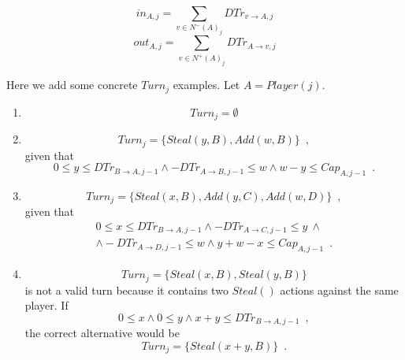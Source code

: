 \documentclass[11pt]{llncs}
\theoremstyle{definition}
\begin{document}
     \begin{definition}
     \label{inouttrust}
        \begin{equation}
           in_{A, j} = \sum\limits_{v \in N^{-}\left(A\right)_j}DTr_{v \rightarrow A, j}
        \end{equation}
        \begin{equation}
           out_{A, j} = \sum\limits_{v \in N^{+}\left(A\right)_j}DTr_{A \rightarrow v, j}
        \end{equation}
     \end{definition}
     \newpage 
     Here we add some concrete $Turn_j$ examples. Let $A = Player(j)$.
     \begin{enumerate}
        \item \begin{equation*}
           Turn_j = \emptyset
        \end{equation*}
        \item \begin{equation*}
           Turn_j = \{Steal\left(y, B\right), Add\left(w, B\right)\} \enspace,
        \end{equation*}
        given that
        \begin{equation*}
           0 \leq y \leq DTr_{B \rightarrow A, j-1} \wedge -DTr_{A \rightarrow B, j-1} \leq w \wedge w - y \leq
           Cap_{A, j-1} \enspace.
        \end{equation*}
        \item \begin{equation*}
           Turn_j = \{Steal\left(x, B\right), Add\left(y, C\right), Add\left(w, D\right)\} \enspace,
        \end{equation*}
        given that
        \begin{equation*}
        \begin{gathered}
           0 \leq x \leq DTr_{B \rightarrow A, j-1} \wedge -DTr_{A \rightarrow C, j-1} \leq y \: \wedge \\
           \wedge -DTr_{A \rightarrow D, j-1} \leq w \wedge y + w - x \leq Cap_{A, j-1} \enspace.
        \end{gathered}
        \end{equation*}
        \item \begin{equation*}
           Turn_j = \{Steal\left(x, B\right), Steal\left(y, B\right)\}
        \end{equation*}
        is not a valid turn because it contains two $Steal\left(\right)$ actions against the same player. If
        \begin{equation*}
           0 \leq x \wedge 0 \leq y \wedge x + y \leq DTr_{B \rightarrow A, j-1} \enspace,
        \end{equation*}
        the correct alternative would be
        \begin{equation*}
           Turn_j = \{Steal\left(x+y, B\right)\} \enspace.
        \end{equation*}
     \end{enumerate}
\end{document}
